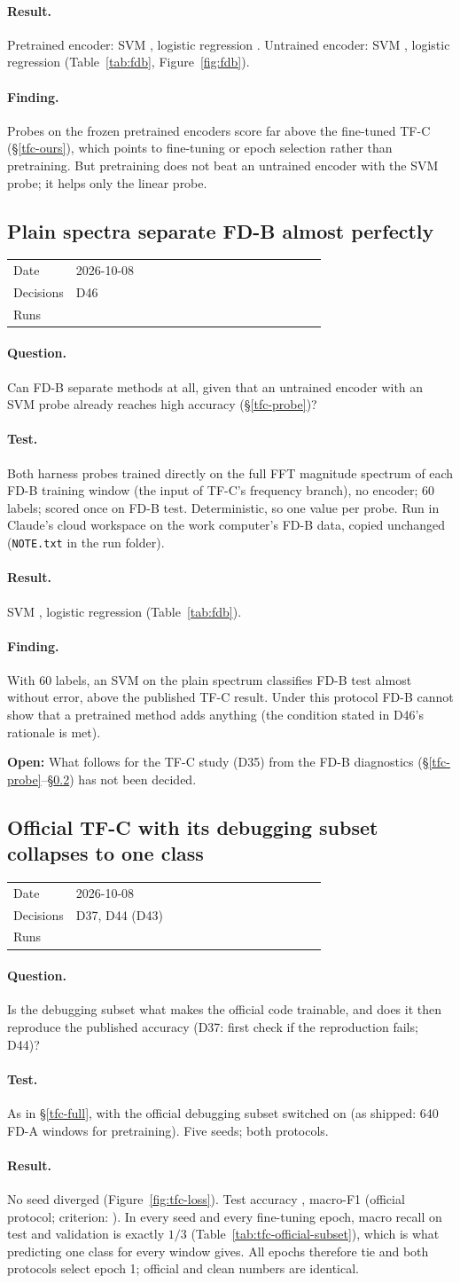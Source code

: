 \documentclass[11pt,a4paper]{article}
\makeatletter
\newcommand{\entry}[5]{%
  \subsection{#2}\label{#1}
  \begin{tabular}{@{}>{\footnotesize\color{muted}}l>{\footnotesize}p{0.8\linewidth}@{}}
    Date & #3 \\ Decisions & #4 \\ Runs & #5
  \end{tabular}\par}
\newcommand{\question}{\paragraph{Question.}}
\newcommand{\test}{\paragraph{Test.}}
\newcommand{\result}{\paragraph{Result.}}
\newcommand{\finding}{\paragraph{Finding.}}
\newcommand{\openpoint}[1]{\par\textcolor{openpt}{\textbf{Open:}} #1\par}
\newcommand{\run}[1]{\texttt{\detokenize{#1}}}
\newcommand{\sref}[1]{\S\ref{#1}}
\makeatother
\begin{document}
\result
Pretrained encoder: SVM \TfcProbePreSvm, logistic regression \TfcProbePreLogreg.
Untrained encoder: SVM \TfcProbeRandSvm, logistic regression \TfcProbeRandLogreg{}
(Table~\ref{tab:fdb}, Figure~\ref{fig:fdb}).

\finding
Probes on the frozen pretrained encoders score far above the fine-tuned TF-C (\sref{tfc-ours}), which
points to fine-tuning or epoch selection rather than pretraining. But pretraining does
not beat an untrained encoder with the SVM probe; it helps only the linear probe.

\entry{fdb-spectrum}{Plain spectra separate FD-B almost perfectly}{2026-10-08}
  {D46}{\run{20261008_162447_probe_spectrum_fd}}

\question
Can FD-B separate methods at all, given that an untrained encoder with an SVM probe
already reaches high accuracy (\sref{tfc-probe})?

\test
Both harness probes trained directly on the full FFT magnitude spectrum of each FD-B
training window (the input of TF-C's frequency branch), no encoder; 60 labels; scored once
on FD-B test. Deterministic, so one value per probe. Run in Claude's cloud workspace on
the work computer's FD-B data, copied unchanged (\texttt{NOTE.txt} in the run folder).

\result
SVM \FdbSpecSvm, logistic regression \FdbSpecLogreg{} (Table~\ref{tab:fdb}).

\finding
With 60 labels, an SVM on the plain spectrum classifies FD-B test almost without error,
above the published TF-C result. Under this protocol FD-B cannot show that a pretrained
method adds anything (the condition stated in D46's rationale is met).

\openpoint{What follows for the TF-C study (D35) from the FD-B diagnostics (\sref{tfc-probe}--\sref{tfc-subset}) has not been decided.}

\entry{tfc-subset}{Official TF-C with its debugging subset collapses to one class}{2026-10-08}
  {D37, D44 (D43)}{\run{20261008_171159_tfc_official_fd_subset}}

\question
Is the debugging subset what makes the official code trainable, and does it then
reproduce the published accuracy (D37: first check if the reproduction fails; D44)?

\test
As in \sref{tfc-full}, with the official debugging subset switched on (as shipped: 640 FD-A windows for
pretraining). Five seeds; both protocols.

\result
No seed diverged (Figure~\ref{fig:tfc-loss}). Test accuracy \TfcSubsetAcc{}, macro-F1
\TfcSubsetFone{} (official protocol; criterion: \TfcSubsetVerdict). In every seed and every
fine-tuning epoch, macro recall on test and validation is exactly $1/3$
(Table~\ref{tab:tfc-official-subset}), which is what predicting one class for every
window gives. All epochs therefore tie and both protocols select epoch 1; official and
clean numbers are identical.
\end{document}
